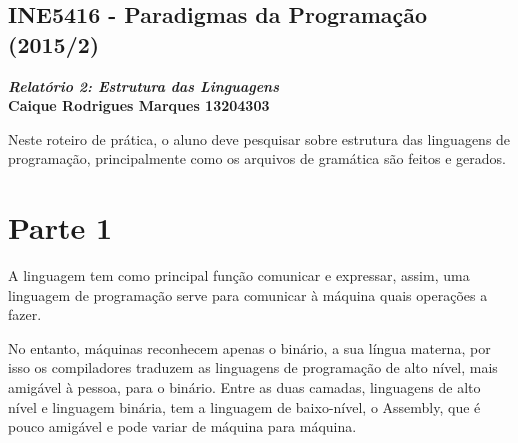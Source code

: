 \documentclass{article}
\begin{document}
\lstset{language=C}
\begin{center}
    \section*{INE5416 - Paradigmas da Programação (2015/2)}
    \textbf{\textit{Relatório 2: Estrutura das Linguagens} \\
    Caique Rodrigues Marques 13204303}
\end{center}
    Neste roteiro de prática, o aluno deve pesquisar sobre estrutura das linguagens de programação, principalmente como os arquivos de gramática são feitos e gerados.
\section*{Parte 1}
    A linguagem tem como principal função comunicar e expressar, assim, uma linguagem de programação serve para comunicar à máquina quais operações a fazer.

    No entanto, máquinas reconhecem apenas o binário, a sua língua materna, por isso os compiladores traduzem as linguagens de programação de alto nível, mais amigável à pessoa, para o binário. Entre as duas camadas, linguagens de alto nível e linguagem binária, tem a linguagem de baixo-nível, o Assembly, que é pouco amigável e pode variar de máquina para máquina.
\end{document}
